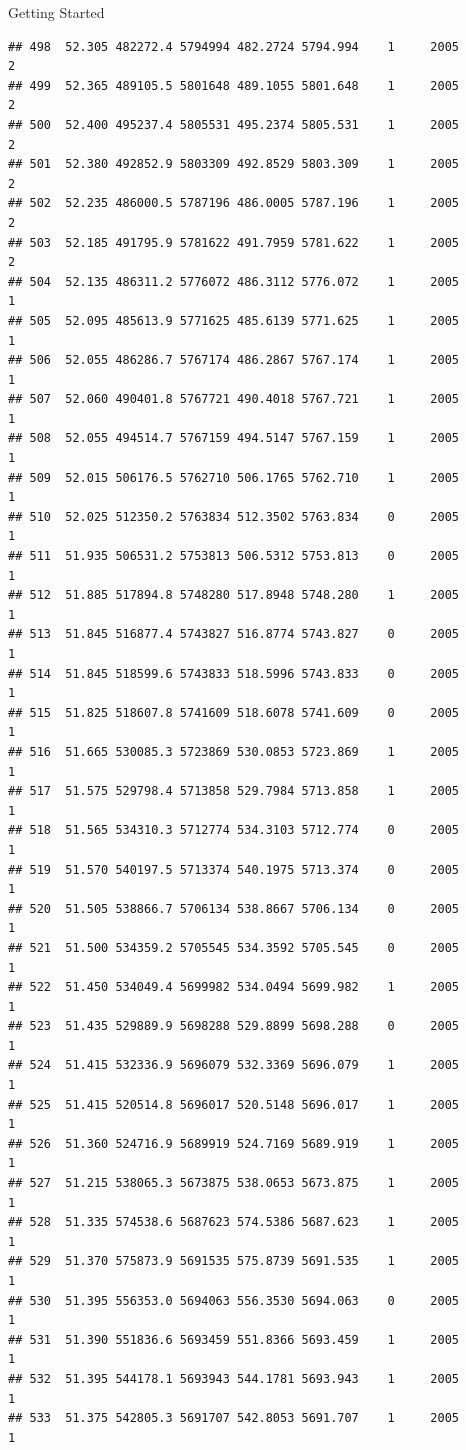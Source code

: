 \documentclass[
  ignorenonframetext,
]{beamer}
\begin{document}
\begin{frame}[fragile]{Getting Started}
\begin{verbatim}
## 498  52.305 482272.4 5794994 482.2724 5794.994    1     2005        2
## 499  52.365 489105.5 5801648 489.1055 5801.648    1     2005        2
## 500  52.400 495237.4 5805531 495.2374 5805.531    1     2005        2
## 501  52.380 492852.9 5803309 492.8529 5803.309    1     2005        2
## 502  52.235 486000.5 5787196 486.0005 5787.196    1     2005        2
## 503  52.185 491795.9 5781622 491.7959 5781.622    1     2005        2
## 504  52.135 486311.2 5776072 486.3112 5776.072    1     2005        1
## 505  52.095 485613.9 5771625 485.6139 5771.625    1     2005        1
## 506  52.055 486286.7 5767174 486.2867 5767.174    1     2005        1
## 507  52.060 490401.8 5767721 490.4018 5767.721    1     2005        1
## 508  52.055 494514.7 5767159 494.5147 5767.159    1     2005        1
## 509  52.015 506176.5 5762710 506.1765 5762.710    1     2005        1
## 510  52.025 512350.2 5763834 512.3502 5763.834    0     2005        1
## 511  51.935 506531.2 5753813 506.5312 5753.813    0     2005        1
## 512  51.885 517894.8 5748280 517.8948 5748.280    1     2005        1
## 513  51.845 516877.4 5743827 516.8774 5743.827    0     2005        1
## 514  51.845 518599.6 5743833 518.5996 5743.833    0     2005        1
## 515  51.825 518607.8 5741609 518.6078 5741.609    0     2005        1
## 516  51.665 530085.3 5723869 530.0853 5723.869    1     2005        1
## 517  51.575 529798.4 5713858 529.7984 5713.858    1     2005        1
## 518  51.565 534310.3 5712774 534.3103 5712.774    0     2005        1
## 519  51.570 540197.5 5713374 540.1975 5713.374    0     2005        1
## 520  51.505 538866.7 5706134 538.8667 5706.134    0     2005        1
## 521  51.500 534359.2 5705545 534.3592 5705.545    0     2005        1
## 522  51.450 534049.4 5699982 534.0494 5699.982    1     2005        1
## 523  51.435 529889.9 5698288 529.8899 5698.288    0     2005        1
## 524  51.415 532336.9 5696079 532.3369 5696.079    1     2005        1
## 525  51.415 520514.8 5696017 520.5148 5696.017    1     2005        1
## 526  51.360 524716.9 5689919 524.7169 5689.919    1     2005        1
## 527  51.215 538065.3 5673875 538.0653 5673.875    1     2005        1
## 528  51.335 574538.6 5687623 574.5386 5687.623    1     2005        1
## 529  51.370 575873.9 5691535 575.8739 5691.535    1     2005        1
## 530  51.395 556353.0 5694063 556.3530 5694.063    0     2005        1
## 531  51.390 551836.6 5693459 551.8366 5693.459    1     2005        1
## 532  51.395 544178.1 5693943 544.1781 5693.943    1     2005        1
## 533  51.375 542805.3 5691707 542.8053 5691.707    1     2005        1

\end{verbatim}
\end{frame}
\end{document}
